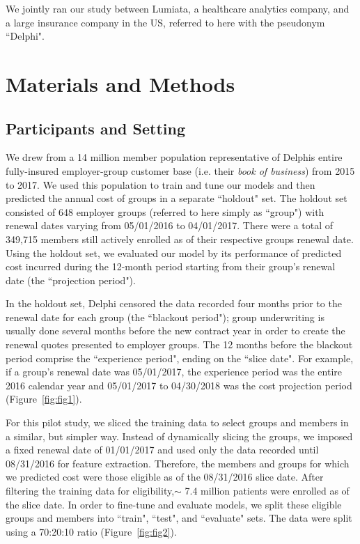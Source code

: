 \documentclass[letterpaper]{article} %
\begin{document}
We jointly ran our study between Lumiata, a healthcare analytics company, and a large insurance company in the US, referred to here with the pseudonym ``Delphi".

\section*{Materials and Methods}





\subsection{Participants and Setting}
We drew from a 14 million member population representative of Delphis entire fully-insured employer-group customer base (i.e. their \textit{book of business}) from 2015 to 2017. We used this population to train and tune our models and then predicted the annual cost of groups in a separate ``holdout" set. The holdout set consisted of 648 employer groups (referred  to here simply as ``group") with renewal dates varying from 05/01/2016 to 04/01/2017. There were a total of 349,715 members still actively enrolled as of their respective groups renewal date. Using the holdout set, we evaluated our model by its performance of predicted cost incurred during the 12-month period starting from their group's renewal date (the ``projection period").


In the holdout set, Delphi censored the data recorded four months prior to the renewal date for each group (the ``blackout period"); group underwriting is usually done several months before the new contract year in order to create the renewal quotes presented to employer groups. The 12 months before the blackout period comprise the ``experience period", ending on the ``slice date". For example, if a group's renewal date was 05/01/2017, the experience period was the entire 2016 calendar year and 05/01/2017 to 04/30/2018 was the cost projection period (Figure~\ref{fig:fig1}). 


For this pilot study, we sliced the training data to select groups and members in a similar, but simpler way. Instead of dynamically slicing the groups, we imposed a fixed renewal date of 01/01/2017 and used only the data recorded until 08/31/2016 for feature extraction.  Therefore, the members and groups for which we predicted cost were those eligible as of the 08/31/2016 slice date. After filtering the training data for eligibility,$\sim$ 7.4 million patients were enrolled as of the slice date. In order to fine-tune and evaluate models, we split these eligible groups and members into ``train", ``test", and ``evaluate" sets. The data were split using a 70:20:10 ratio (Figure~\ref{fig:fig2}).
\end{document}
